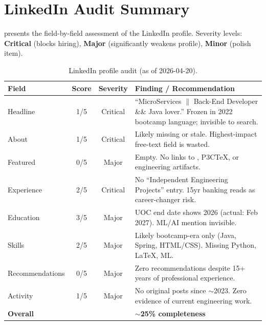\documentclass[a4paper,11pt,openany]{report}
\begin{document}

\section{LinkedIn Audit Summary}

 presents the field-by-field assessment of the
LinkedIn profile. Severity levels: \textbf{Critical} (blocks hiring),
\textbf{Major} (significantly weakens profile), \textbf{Minor} (polish item).

\begin{table}[htbp]
\centering
\caption{LinkedIn profile audit (as of 2026-04-20).}
\label{tab:linkedin-audit}
\small
\begin{tabularx}{\textwidth}{l c c X}
\toprule
\textbf{Field} & \textbf{Score} & \textbf{Severity} & \textbf{Finding / Recommendation} \\
\midrule
Headline & 1/5 & Critical & ``MicroServices $\|$ Back-End Developer \&\& Java lover.'' Frozen in 2022 bootcamp language; invisible to search. \\
About & 1/5 & Critical & Likely missing or stale. Highest-impact free-text field is wasted. \\
Featured & 0/5 & Major & Empty. No links to \projectName{}, P3CTeX, or engineering artifacts. \\
Experience & 2/5 & Critical & No ``Independent Engineering Projects'' entry. 15yr banking reads as career-changer risk. \\
Education & 3/5 & Major & UOC end date shows 2026 (actual: Feb 2027). ML/AI mention invisible. \\
Skills & 2/5 & Major & Likely bootcamp-era only (Java, Spring, HTML/CSS). Missing Python, LaTeX, ML. \\
Recommendations & 0/5 & Major & Zero recommendations despite 15+ years of professional experience. \\
Activity & 1/5 & Major & No original posts since $\sim$2023. Zero evidence of current engineering work. \\
\midrule
\multicolumn{2}{l}{\textbf{Overall}} & & \textbf{$\sim$25\% completeness} \\
\bottomrule
\end{tabularx}
\end{table}
\end{document}
